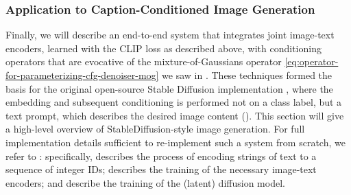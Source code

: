 \documentclass[../../book-main.tex]{subfiles}
\begin{document}
\subsubsection{Application to Caption-Conditioned Image Generation}


Finally, we will describe an end-to-end system that integrates joint image-text
encoders, learned with the CLIP loss as described above, with conditioning
operators that are evocative of the mixture-of-Gaussians operator
\eqref{eq:operator-for-parameterizing-cfg-denoiser-mog} we saw in
.
These techniques
formed the basis for the original open-source Stable Diffusion implementation
\cite{rombach2022high},
where the embedding and subsequent conditioning is performed not on
a class label, but a text prompt, which describes the desired image content
().
This section will give a high-level overview of StableDiffusion-style image
generation. For full implementation details sufficient to re-implement such
a system from scratch, we refer to : specifically,
 describes the process of encoding strings of text to
a sequence of integer IDs;  describes the training of the
necessary image-text encoders; and 
describe the training of the (latent) diffusion model.
\end{document}
